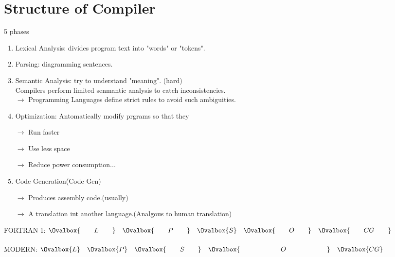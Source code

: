 \documentclass{report}
\begin{document}
    \section{\textcolor{stanfordred}{Structure of Compiler}}
    5 phases
    \begin{enumerate}
        \item \textcolor{stanfordred}{Lexical Analysis}: divides program text into "words" or "tokens".
        \item \textcolor{stanfordred}{Parsing}: diagramming sentences.
        \item \textcolor{stanfordred}{Semantic Analysis}: try to understand "meaning". (hard)\\
        Compilers perform limited senmantic analysis to catch inconsistencies.\\
        \(\rightarrow\) Programming Languages define strict rules to avoid such ambiguities.
        \item \textcolor{stanfordred}{Optimization}: Antomatically modify prgrams so that they
        
        \(\rightarrow\) Run faster

        \(\rightarrow\) Use less space

        \(\rightarrow\) Reduce power consumption...

        \item \textcolor{stanfordred}{Code Generation(Code Gen)}
        
        \(\rightarrow\) Produces assembly code.(usually)

        \(\rightarrow\) A translation int another language.(Analgous to human translation)

    \end{enumerate}
    \begin{flushleft}
        FORTRAN 1: \(\Ovalbox{\quad\quad L \quad\quad}\quad\Ovalbox{\quad\quad P \quad\quad}\quad\Ovalbox{S}\quad\Ovalbox{\quad\quad O \quad\quad}\quad\Ovalbox{\quad\quad CG \quad\quad}\)\\
        \hspace*{\fill} \\
        \quad MODERN: \(\Ovalbox{ L }\quad\Ovalbox{ P }\quad\Ovalbox{\quad\quad S\quad\quad}\quad\Ovalbox{\quad\quad\quad\quad\quad\quad O \quad\quad\quad\quad\quad\quad}\quad\Ovalbox{ CG }\)\\
    \end{flushleft}
    
\end{document}
